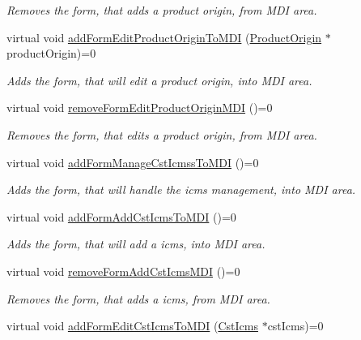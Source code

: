 \begin{DoxyCompactItemize}
\begin{DoxyCompactList}\small\item\em \-Removes the form, that adds a product origin, from \-M\-D\-I area. \end{DoxyCompactList}\item 
virtual void \hyperlink{class_i_main_window_af58a9a09065bfdf77a0b2f82261289bb}{add\-Form\-Edit\-Product\-Origin\-To\-M\-D\-I} (\hyperlink{class_product_origin}{\-Product\-Origin} $\ast$product\-Origin)=0
\begin{DoxyCompactList}\small\item\em \-Adds the form, that will edit a product origin, into \-M\-D\-I area. \end{DoxyCompactList}\item 
virtual void \hyperlink{class_i_main_window_ae7a04f82355242d60017a0992c6636bf}{remove\-Form\-Edit\-Product\-Origin\-M\-D\-I} ()=0
\begin{DoxyCompactList}\small\item\em \-Removes the form, that edits a product origin, from \-M\-D\-I area. \end{DoxyCompactList}\item 
virtual void \hyperlink{class_i_main_window_a30c7c420c2fca692b6e3e2717608b2cf}{add\-Form\-Manage\-Cst\-Icmss\-To\-M\-D\-I} ()=0
\begin{DoxyCompactList}\small\item\em \-Adds the form, that will handle the icms management, into \-M\-D\-I area. \end{DoxyCompactList}\item 
virtual void \hyperlink{class_i_main_window_ad8543257fb4c87964e1e5a2d7d1baf9a}{add\-Form\-Add\-Cst\-Icms\-To\-M\-D\-I} ()=0
\begin{DoxyCompactList}\small\item\em \-Adds the form, that will add a icms, into \-M\-D\-I area. \end{DoxyCompactList}\item 
virtual void \hyperlink{class_i_main_window_afaf6476daf87714476c94e0e4f17aa28}{remove\-Form\-Add\-Cst\-Icms\-M\-D\-I} ()=0
\begin{DoxyCompactList}\small\item\em \-Removes the form, that adds a icms, from \-M\-D\-I area. \end{DoxyCompactList}\item 
virtual void \hyperlink{class_i_main_window_ad186178a702f11f2f163f7938db22274}{add\-Form\-Edit\-Cst\-Icms\-To\-M\-D\-I} (\hyperlink{class_cst_icms}{\-Cst\-Icms} $\ast$cst\-Icms)=0

\end{DoxyCompactItemize}
